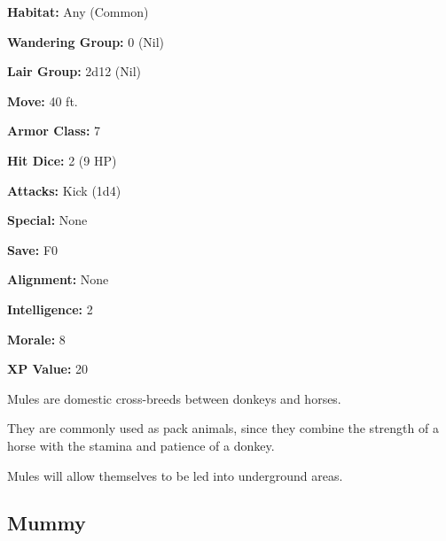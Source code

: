 \begin{multicols*}{2}
{\textbf{Habitat:} Any (Common)

\textbf{Wandering Group:} 0 (Nil)

\textbf{Lair Group:} 2d12 (Nil)

\textbf{Move:} 40 ft.

\textbf{Armor Class:} 7

\textbf{Hit Dice:} 2 (9 HP)

\textbf{Attacks:} Kick (1d4)

\textbf{Special:} None

\textbf{Save:} F0

\textbf{Alignment:} None

\textbf{Intelligence:} 2

\textbf{Morale:} 8

\textbf{XP Value:} 20}

Mules are domestic cross-breeds between donkeys and horses.

They are commonly used as pack animals, since they combine the strength of a horse with the stamina and patience of a donkey.

Mules will allow themselves to be led into underground areas.

\subsection{Mummy}
\end{multicols*}
